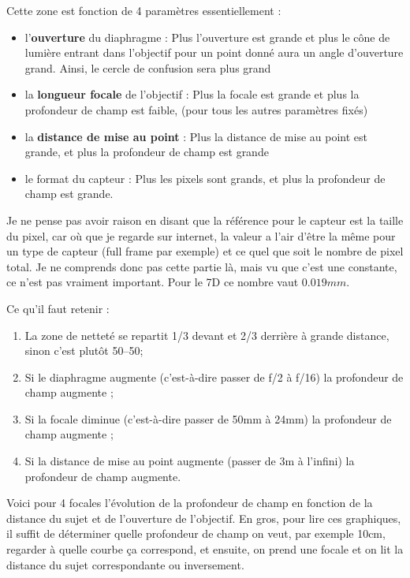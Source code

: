\documentclass[a4paper,twoside]{article}
\begin{document}
Cette zone est fonction de 4 paramètres essentiellement :
\begin{itemize}
\item l'\textbf{ouverture} du diaphragme : Plus l'ouverture est grande et plus le cône de lumière entrant dans l'objectif pour un point donné aura un angle d'ouverture grand. Ainsi, le cercle de confusion sera plus grand
\item la \textbf{longueur focale} de l'objectif : Plus la focale est grande et plus la profondeur de champ est faible, (pour tous les autres paramètres fixés)
\item la \textbf{distance de mise au point} : Plus la distance de mise au point est grande, et plus la profondeur de champ est grande
\item le format du capteur : Plus les pixels sont grands, et plus la profondeur de champ est grande.
\end{itemize}

\begin{attention}
Je ne pense pas avoir raison en disant que la référence pour le capteur est la taille du pixel, car où que je regarde sur internet, la valeur a l'air d'être la même pour un type de capteur (full frame par exemple) et ce quel que soit le nombre de pixel total. Je ne comprends donc pas cette partie là, mais vu que c'est une constante, ce n'est pas vraiment important. Pour le 7D ce nombre vaut $0.019\unit{mm}$.
\end{attention}

\begin{important}
Ce qu'il faut retenir : 
\begin{enumerate}
\item La zone de netteté se repartit 1/3 devant et 2/3 derrière à grande distance, sinon c'est plutôt 50--50;
\item Si le diaphragme augmente (c’est-à-dire passer de f/2 à f/16) la profondeur de champ augmente ;
\item Si la focale diminue (c’est-à-dire passer de 50mm à 24mm) la profondeur de champ augmente ;
\item Si la distance de mise au point augmente (passer de 3m à l’infini) la profondeur de champ augmente.
\end{enumerate}
\end{important}

Voici pour 4 focales  l'évolution de la profondeur de champ en fonction de la distance du sujet et de l'ouverture de l'objectif. En gros, pour lire ces graphiques, il suffit de déterminer quelle profondeur de champ on veut, par exemple 10cm, regarder à quelle courbe ça correspond, et ensuite, on prend une focale et on lit la distance du sujet correspondante ou inversement.
\end{document}
